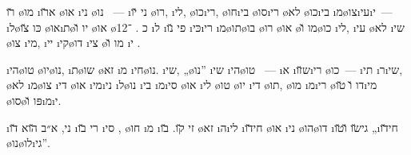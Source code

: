 \u{רו} \o{מו}  \i{א}\u{רו}  \o{או} \i{ני} \o{נו}  ~— \i{ני} \u{יו}  \o{רו}, \i{לי}, \o{כו}\i{רי}, \o{חו}\i{בי} \o{סו}\i{רי} \o{לא} \o{כו}\i{בי} \i{מ}\o{צו}\i{עי}\i{י}~— \i{ל}\o{כּו}  \u{צו} \o{או}\i{ת}\o{יו} \u{ו} \o{או} \o{כ}  .   ־12 \i{ל} \i{פי} \u{נו} \i{כּי}\i{רי}     \i{מ}\o{תו}\o{בו} \o{רו} \o{או}  \o{מו} \u{ו}\o{כו} \i{לי},  \i{עי}    \o{לא} \i{שי} \o{צו} \i{מי},  \i{יי}   \i{קי}\o{דו} \i{צי}\gnuva {} \o{מו} \u{ו} \i{י}   .

\i{הי}\o{טו}  \o{יו}\o{נו},  \i{ת}\o{שו} \o{זא}  \i{מ} \i{חי}\o{נו}. \i{שי}, „\o{נו}”  \i{שי}   \i{הי}\o{טו} ~— \i{א} \i{ש}\u{זו}\i{רי} \o{כו}~— \i{תי} \i{ר}\i{שי}, \o{לא}  \i{מ}\o{צו}  \i{די} \o{או} \i{מי}\i{ני} \i{ל}\o{נו}   \i{בי} \i{מ}\i{סי} \o{או} \i{לי} \o{טו} \o{יו}  \i{די} \o{תו}, \o{מו} \i{מ}\i{רי}   \o{דו} \u{ו} \u{טו}\i{מי} \o{סו}\o{פּו} \u{ו}\i{מ}\i{י}.

\i{ני}, א״ב \u{הוא} \u{דו}  \i{רי}  \u{בו}  \i{סי} ,  \o{חו} \i{מ} \i{זי}  \u{קו}. \u{בו} \o{זא} \i{ה}\i{לי}   \i{חי}\u{דו}  \o{או} \i{ני} \o{הו}\o{דו} \i{גי}\u{שו} \u{ו}\u{טו}  „\i{חי}\u{דו} \o{נו}\o{לו}\i{גי}”.

